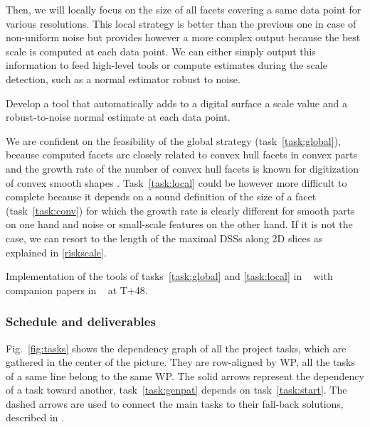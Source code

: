 Then, we will locally focus on the size of all facets covering a same data point for various resolutions. 
This local strategy is better than the previous one in case of non-uniform noise but provides however
a more complex output because the best scale is computed at each data point.
We can either simply output this information to feed high-level tools or compute estimates during
the scale detection, such as a normal estimator robust to noise.  

\begin{Task}
  \label{task:local}
  Develop a tool that automatically adds to a digital surface a scale value and
  a robust-to-noise normal estimate at each data point. 
\end{Task}

\Risks
We are confident on the feasibility of the global strategy (task~\ref{task:global}),
because computed facets are closely related to convex hull facets in convex parts
and the growth rate of the number of convex hull facets is known for digitization
of convex smooth shapes \cite{Barany1998}. 
Task~\ref{task:local} could be however more difficult to complete
because it depends on a sound definition of the size of a facet (task~\ref{task:conv})
for which the growth rate is clearly different for smooth parts on one hand
and noise or small-scale features on the other hand. If it is not the case, we can
resort to the length of the maximal DSSs along 2D slices as explained in \ref{riskscale}.

\Success
  Implementation of the tools of tasks~\ref{task:global} and \ref{task:local}
    in \DGtalTools~ with companion papers in \IPOL~ at T+48.

    

\subsubsection{Schedule and deliverables}
\label{sec:schedule}

Fig.~\ref{fig:tasks} shows the dependency graph of all the project tasks, which
are gathered in the center of the picture. They are row-aligned by WP,
\ie all the tasks of a same line belong to the same WP. 
The solid arrows represent the dependency of a task toward another,
\eg task~\ref{task:genpat} depends on task~\ref{task:start}. 
The dashed arrows are used to connect the main tasks to their fall-back solutions,
described in . 

